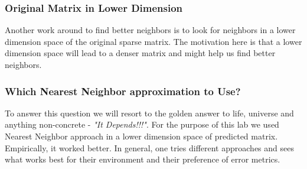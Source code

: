   \subsubsection{Original Matrix in Lower Dimension}
  Another work around to find better neighbors is to look for neighbors in a lower dimension space of the original sparse matrix. The motivation here is that a lower dimension space will lead to a denser matrix and might help us find better neighbors.
  \subsubsection{Which Nearest Neighbor approximation to Use?}
  To answer this question we will resort to the golden answer to life, universe and anything non-concrete - \textit{"It Depends!!!"}. For the purpose of this lab we used Nearest Neighbor approach in a lower dimension space of predicted matrix. Empirically, it worked better. In general, one tries different approaches and sees what works best for their environment and their preference of error metrics.
